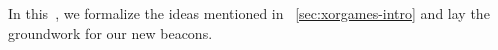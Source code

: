 

In this \Section\,, we formalize the ideas mentioned in \Section~\ref{sec:xorgames-intro} 
and lay the groundwork for our new beacons. 











%   







